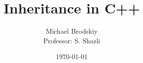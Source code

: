 


\def\code#1{\texttt{#1}}

\pagestyle{fancy}

\title{Inheritance in C++}
\date{\today}
\author{Michael Brodskiy\\ \small Professor: S. Shazli}



\maketitle

\thispagestyle{fancy}

\newpage

